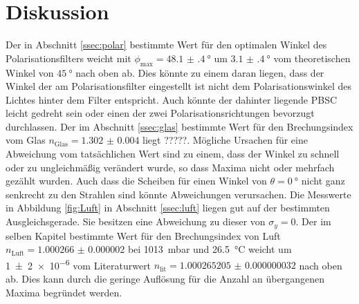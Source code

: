 
\section{Diskussion}
\label{sec:Diskussion}
Der in Abschnitt \ref{ssec:polar} bestimmte Wert für den optimalen Winkel des Polarisationsfilters weicht mit $\phi_\text{max}=\SI{48.1(4)}{\degree}$ um $\SI{3.1(4)}{\degree}$ vom theoretischen Winkel von $\SI{45}{\degree}$ nach oben ab. Dies könnte zu einem daran liegen, dass der Winkel der am Polarisationsfilter eingestellt ist nicht dem Polarisationswinkel des Lichtes hinter dem Filter entspricht. Auch könnte der dahinter liegende PBSC leicht gedreht sein oder einen der zwei Polarisationsrichtungen bevorzugt durchlassen.
Der im Abschnitt \ref{ssec:glas} bestimmte Wert für den Brechungsindex vom Glas $n_\text{Glas}=\num{1.302(4)}$ liegt ?????. Mögliche Ursachen für eine Abweichung vom tatsächlichen Wert sind zu einem, dass der Winkel zu schnell oder zu ungleichmäßig verändert wurde, so dass Maxima nicht oder mehrfach gezählt wurden. Auch dass die Scheiben für einen Winkel von $\theta=\SI{0}{\degree}$ nicht ganz senkrecht zu den Strahlen sind könnte Abweichungen verursachen.
Die Messwerte in Abbildung \ref{fig:Luft} in Abschnitt \ref{ssec:luft} liegen gut auf der bestimmten Ausgleichsgerade. Sie besitzen eine Abweichung zu dieser von $\sigma_y=\num{0}$. Der im selben Kapitel bestimmte Wert für den Brechungsindex von Luft $n_\text{Luft}=\num{1.000266(2)}$ bei \SI{1013}{\milli\bar} und \SI{26.5}{\degreeCelsius} weicht um \num{1(2)e-6} vom Literaturwert $n_\text{lit}=\num{1.000265205(32)}$ \cite{nist} nach oben ab. Dies kann durch die geringe Auflösung für die Anzahl an übergangenen Maxima begründet werden.



